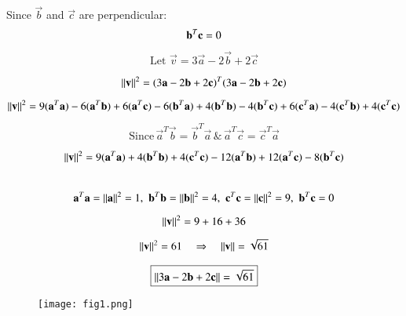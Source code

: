 \documentclass[journal]{IEEEtran}
\begin{document}
Since $\vec{b}$ and $\vec{c}$ are perpendicular: 
\begin{equation}
\vec{b}^T\vec{c} = 0\\
\end{equation}


\begin{equation}
\text{Let} \, \,\vec{v} = 3\vec{a} - 2\vec{b} + 2\vec{c}
\end{equation}


\begin{equation}
\norm{\vec{v}}^2 = (3\vec{a} - 2\vec{b} + 2\vec{c})^T(3\vec{a} - 2\vec{b} + 2\vec{c})
\end{equation}

\begin{equation}
\norm{\vec{v}}^2 = 9(\vec{a}^T\vec{a}) -6(\vec{a}^T\vec{b}) +6(\vec{a}^T\vec{c}) - 6(\vec{b}^T\vec{a}) + 4(\vec{b}^T\vec{b}) -4(\vec{b}^T\vec{c})+ 6(\vec{c}^T\vec{a}) - 4(\vec{c}^T\vec{b}) + 4(\vec{c}^T\vec{c})\\
\end{equation}


\begin{equation}
    \text{Since} \,  \vec{a}^T\vec{b} = \vec{b}^T\vec{a} \, \text{\&}
\, \vec{a}^T\vec{c} = \vec{c}^T\vec{a}
\end{equation}


\begin{equation}
\norm{\vec{v}}^2  =9(\vec{a}^T\vec{a}) + 4(\vec{b}^T\vec{b}) + 4(\vec{c}^T\vec{c}) - 12(\vec{a}^T\vec{b}) + 12(\vec{a}^T\vec{c}) - 8(\vec{b}^T\vec{c})
\end{equation}\\

\begin{equation}
\vec{a}^T\vec{a} = \norm{\vec{a}}^2 = 1, \,\,
\vec{b}^T\vec{b} = \norm{\vec{b}}^2 = 4, \,\,
\vec{c}^T\vec{c} = \norm{\vec{c}}^2 = 9, \,\,
\vec{b}^T\vec{c} = 0
\end{equation}


\begin{equation}
\norm{\vec{v}}^2 = 9 + 16 + 36
\end{equation}


\begin{align}
    \centering
    \norm{\vec{v}}^2 = 61 
    \quad \Rightarrow \quad
    \norm{\vec{v}} = \sqrt{61}
\end{align}

\begin{align}
\centering
\boxed{\norm{3\vec{a} - 2\vec{b} + 2\vec{c}} = \sqrt{61}}
\end{align}

\begin{figure}[h!]
   \centering
   \texttt{[image: fig1.png]}
   \caption{}
   \label{stemplot}
\end{figure}
\end{document}
